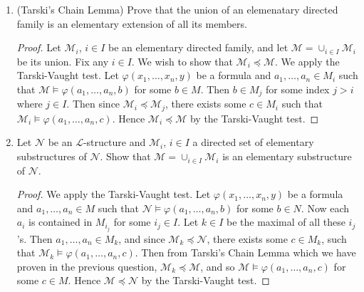\documentclass{article}
\begin{document}
\begin{enumerate}

  \item (Tarski's Chain Lemma) Prove that the union of an elemenatary
    directed family is an elementary extension of all its members.
    \begin{proof}
      Let $\mathcal{M}_i$, $i\in I$ be an elementary directed family, and
      let $\mathcal{M}=\cup_{i\in I}\mathcal{M}_i$ be its union. Fix any
      $i\in I$. We wish to show that $\mathcal{M}_i\preceq\mathcal{M}$. We
      apply the Tarski-Vaught test. Let $\varphi(x_1,\ldots,x_n,y)$ be a
      formula and $a_1,\ldots,a_n\in M_i$ such that
      $\mathcal{M}\models\varphi(a_1,\ldots,a_n,b)$ for some $b\in M$. Then
      $b\in M_j$ for some index $j>i$ where $j\in I$. Then since
      $\mathcal{M}_i\preceq\mathcal{M}_j$, there exists some $c\in M_i$
      such that $\mathcal{M}_i\models\varphi(a_1,\ldots,a_n,c)$. Hence
      $\mathcal{M}_i\preceq\mathcal{M}$ by the Tarski-Vaught test.
    \end{proof}

  \item Let $\mathcal{N}$ be an $\mathcal{L}$-structure and
    $\mathcal{M}_i$, $i\in I$ a directed set of elementary substructures of
    $\mathcal{N}$. Show that $\mathcal{M}=\cup_{i\in I}\mathcal{M}_i$ is an
    elementary substructure of $\mathcal{N}$.

    \begin{proof}
      We apply the Tarski-Vaught test. Let $\varphi(x_1,\ldots,x_n,y)$ be a
      formula and $a_1,\ldots,a_n\in M$ such that
      $\mathcal{N}\models\varphi(a_1,\ldots,a_n,b)$ for some $b\in N$. Now
      each $a_i$ is contained in $M_{i_j}$ for some $i_j\in I$. Let $k\in
      I$ be the maximal of all these $i_j$'s. Then $a_1,\ldots,a_n\in M_k$,
      and since $\mathcal{M}_k\preceq\mathcal{N}$, there exists some $c\in
      M_k$, such that $\mathcal{M}_k\models\varphi(a_1,\ldots,a_n,c)$. Then
      from Tarski's Chain Lemma which we have proven in the previous
      question, $\mathcal{M}_k\preceq\mathcal{M}$, and so
      $\mathcal{M}\models\varphi(a_1,\ldots,a_n,c)$ for some $c\in M$. Hence
      $\mathcal{M}\preceq\mathcal{N}$ by the Tarski-Vaught test.
    \end{proof}


\end{enumerate}
\end{document}
